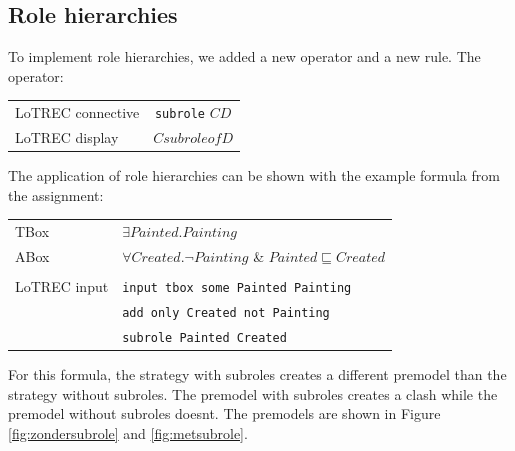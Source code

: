 \documentclass[11pt]{article} %
\begin{document}
\subsection{Role hierarchies}

To implement role hierarchies, we added a new operator and a new rule. The operator:

\begin{table}[h]
\begin{center}
\begin{tabular}{l c}
LoTREC connective & \texttt{subrole} $C D$ \\
LoTREC display & $C subrole of D$ \\
\end{tabular}
\end{center}
\end{table}

The application of role hierarchies can be shown with the example formula from the assignment:

\begin{table}[h]
\begin{center}
\begin{tabular}{l l}
TBox & $\exists{}Painted.Painting$ \\
ABox & $\forall{}Created.\neg{}Painting$ \& $Painted\sqsubseteq{}Created$ \\
\\
LoTREC input & \texttt{input tbox some Painted Painting} \\
 & \texttt{add only Created not Painting}\\
 & \texttt{subrole Painted Created} \\
\end{tabular}
\end{center}
\end{table}

For this formula, the strategy with subroles creates a different premodel than the strategy without subroles. The premodel with subroles creates a clash while the premodel without subroles doesnt. The premodels are shown in Figure \ref{fig:zondersubrole} and \ref{fig:metsubrole}.
\end{document}
